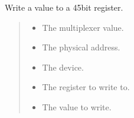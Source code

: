 \documentclass[letterpaper,10pt,english]{sphinxmanual}
\begin{document}
\begin{fulllineitems}
\label{\detokenize{cplddocs:phy_marvell_88X2222_init.write45}}
\pysigstartsignatures
{}
\pysigstopsignatures
\sphinxAtStartPar
Write a value to a 45\sphinxhyphen{}bit register.
\begin{quote}\begin{description}
\begin{itemize}
\item {} 
\sphinxAtStartPar
{} \textendash{} The multiplexer value.

\item {} 
\sphinxAtStartPar
{} \textendash{} The physical address.

\item {} 
\sphinxAtStartPar
{} \textendash{} The device.

\item {} 
\sphinxAtStartPar
{} \textendash{} The register to write to.

\item {} 
\sphinxAtStartPar
{} \textendash{} The value to write.

\end{itemize}

\end{description}\end{quote}

\end{fulllineitems}

\end{document}
